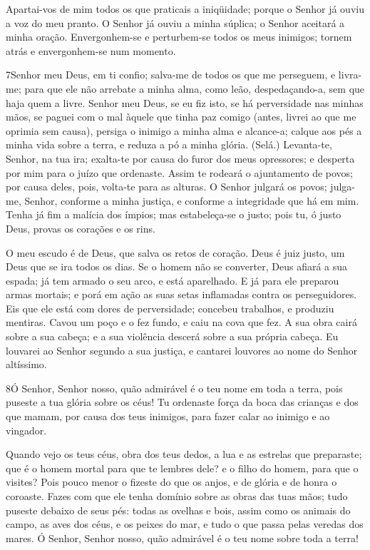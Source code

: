 Apartai-vos de mim todos os que praticais a iniqüidade; porque o
Senhor já ouviu a voz do meu pranto. O Senhor já ouviu a minha
súplica; o Senhor aceitará a minha oração. Envergonhem-se e
perturbem-se todos os meus inimigos; tornem atrás e envergonhem-se
num momento.

\bigskip

\lettrine{7}{}Senhor meu Deus, em ti confio; salva-me de todos
os que me perseguem, e livra-me; para que ele não arrebate a
minha alma, como leão, despedaçando-a, sem que haja quem a livre.
Senhor meu Deus, se eu fiz isto, se há perversidade nas minhas
mãos, se paguei com o mal àquele que tinha paz comigo (antes,
livrei ao que me oprimia sem causa), persiga o inimigo a minha
alma e alcance-a; calque aos pés a minha vida sobre a terra, e
reduza a pó a minha glória. (Selá.) Levanta-te, Senhor, na tua
ira; exalta-te por causa do furor dos meus opressores; e desperta
por mim para o juízo que ordenaste. Assim te rodeará o
ajuntamento de povos; por causa deles, pois, volta-te para as
alturas. O Senhor julgará os povos; julga-me, Senhor, conforme a
minha justiça, e conforme a integridade que há em mim. Tenha já
fim a malícia dos ímpios; mas estabeleça-se o justo; pois tu, ó
justo Deus, provas os corações e os rins.

O meu escudo é de Deus, que salva os retos de coração.
Deus é juiz justo, um Deus que se ira todos os dias.
Se o homem não se converter, Deus afiará a sua espada; já tem
armado o seu arco, e está aparelhado. E já para ele preparou
armas mortais; e porá em ação as suas setas inflamadas contra os
perseguidores. Eis que ele está com dores de perversidade;
concebeu trabalhos, e produziu mentiras. Cavou um poço e o
fez fundo, e caiu na cova que fez. A sua obra cairá sobre a
sua cabeça; e a sua violência descerá sobre a sua própria cabeça.
Eu louvarei ao Senhor segundo a sua justiça, e cantarei
louvores ao nome do Senhor altíssimo.

\bigskip

\lettrine{8}{}Ó Senhor, Senhor nosso, quão admirável é o teu
nome em toda a terra, pois puseste a tua glória sobre os céus!
Tu ordenaste força da boca das crianças e dos que mamam, por
causa dos teus inimigos, para fazer calar ao inimigo e ao vingador.

Quando vejo os teus céus, obra dos teus dedos, a lua e as estrelas
que preparaste; que é o homem mortal para que te lembres dele? e
o filho do homem, para que o visites? Pois pouco menor o fizeste
do que os anjos, e de glória e de honra o coroaste. Fazes com
que ele tenha domínio sobre as obras das tuas mãos; tudo puseste
debaixo de seus pés: todas as ovelhas e bois, assim como os
animais do campo, as aves dos céus, e os peixes do mar, e tudo o
que passa pelas veredas dos mares. Ó Senhor, Senhor nosso, quão
admirável é o teu nome sobre toda a terra!

